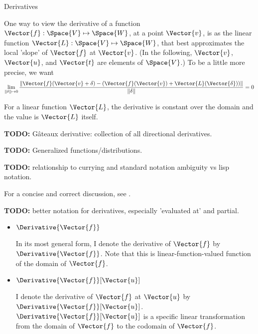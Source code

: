 \begin{plSection}{Derivatives}
\label{sec:Derivatives}

One way to view the derivative of a 
function~\cite{wiki:FrechetDerivative}
$\Vector{f} : \Space{V} \mapsto \Space{W}$,
at a point $\Vector{v}$,
is as the linear function $\Vector{L}:\Space{V} \mapsto \Space{W}$,
that best approximates the local 'slope' of $\Vector{f}$ at $\Vector{v}$.
(In the following, $\Vector{v}$, $\Vector{u}$, and $\Vector{t}$ are elements of $\Space{V}$.)
To be a little more precise, we want
\begin{equation}
\lim_{ \|{\bf \delta}  \| \mapsto 0}
\frac{ \| \Vector{f}(\Vector{v} + {\bf \delta}) - (\Vector{f}(\Vector{v}) + \Vector{L}(\Vector{\delta})) \|}
{\|{\bf \delta}  \| }
 = 0
\end{equation}

\begin{plNote}{}{}
For a linear function $\Vector{L}$,
the derivative is constant over the domain
and the value is $\Vector{L}$ itself.
\end{plNote}

\textbf{TODO:} G\^{a}teaux derivative: collection of all
directional derivatives.

\textbf{TODO:} Generalized functions/distributions.

\textbf{TODO:}
relationship to currying and standard notation ambiguity vs
lisp notation.

For a concise and correct discussion, 
see .

\textbf{TODO:} better notation for derivatives, especially 
'evaluated at' and partial.

\begin{itemize}

\item $\Derivative{\Vector{f}}$

In its most general form,
I denote the derivative of $\Vector{f}$ by $\Derivative{\Vector{f}}$.
Note that this is linear-function-valued function 
of the domain of $\Vector{f}$.

\item $\Derivative{\Vector{f}}[\Vector{u}]$

I denote the derivative of $\Vector{f}$ at $\Vector{u}$ by $\Derivative{\Vector{f}}[\Vector{u}]$.
$\Derivative{\Vector{f}}[\Vector{u}]$ is a specific linear transformation from
the domain of $\Vector{f}$ to the codomain of $\Vector{f}$.


\end{itemize}
\end{plSection}
